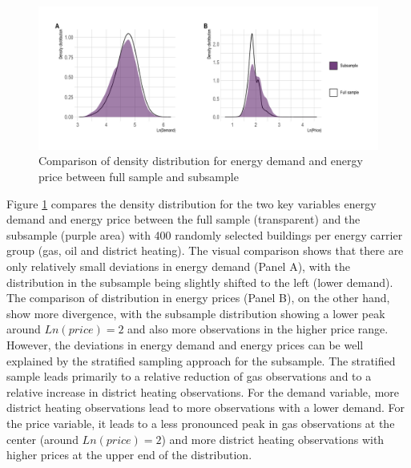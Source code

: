 \documentclass[12pt,twoside]{reedthesis}
\begin{document}
\newpage
\begin{figure}

{\centering \includegraphics[width=1\linewidth]{figure/density-distribution-comparison-samples} 

}

\caption{Comparison of density distribution for energy demand and energy price between full sample and subsample}\label{fig:density-distribution-comparison-samples}
\end{figure}
\noindent
Figure \ref{fig:density-distribution-comparison-samples} compares the density distribution for the two key variables energy demand and energy price between the full sample (transparent) and the subsample (purple area) with 400 randomly selected buildings per energy carrier group (gas, oil and district heating). The visual comparison shows that there are only relatively small deviations in energy demand (Panel A), with the distribution in the subsample being slightly shifted to the left (lower demand). The comparison of distribution in energy prices (Panel B), on the other hand, show more divergence, with the subsample distribution showing a lower peak around \(Ln(price) = 2\) and also more observations in the higher price range. However, the deviations in energy demand and energy prices can be well explained by the stratified sampling approach for the subsample. The stratified sample leads primarily to a relative reduction of gas observations and to a relative increase in district heating observations. For the demand variable, more district heating observations lead to more observations with a lower demand. For the price variable, it leads to a less pronounced peak in gas observations at the center (around \(Ln(price) = 2\)) and more district heating observations with higher prices at the upper end of the distribution.

\newpage
\end{document}
